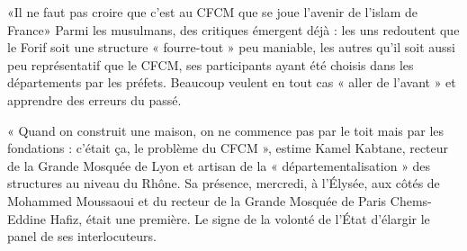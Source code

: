 «Il ne faut pas croire que c’est au CFCM que se joue l’avenir de l’islam de France»
Parmi les musulmans, des critiques émergent déjà : les uns redoutent que le Forif soit une structure « fourre-tout » peu maniable, les autres qu’il soit aussi peu représentatif que le CFCM, ses participants ayant été choisis dans les départements par les préfets. Beaucoup veulent en tout cas « aller de l’avant » et apprendre des erreurs du passé.

« Quand on construit une maison, on ne commence pas par le toit mais par les fondations : c’était ça, le problème du CFCM », estime Kamel Kabtane, recteur de la Grande Mosquée de Lyon et artisan de la « départementalisation » des structures au niveau du Rhône. Sa présence, mercredi, à l’Élysée, aux côtés de Mohammed Moussaoui et du recteur de la Grande Mosquée de Paris Chems-Eddine Hafiz, était une première. Le signe de la volonté de l’État d’élargir le panel de ses interlocuteurs.